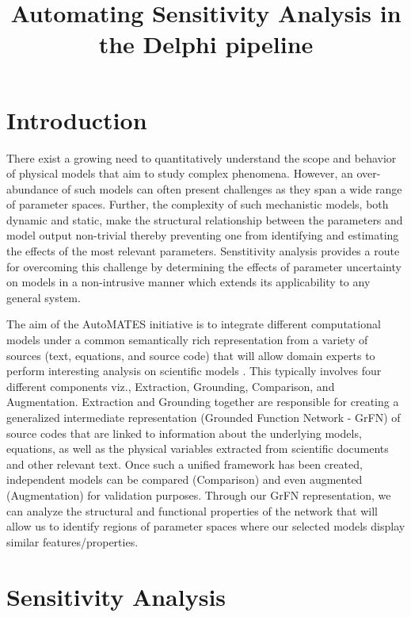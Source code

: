 \documentclass[prb,superscriptaddress,amsmath]{revtex4}
\begin{document}
\title{Automating Sensitivity Analysis in the Delphi pipeline}

\maketitle

\section{Introduction}

There exist a growing need to  quantitatively understand  the scope and behavior of
physical models that aim to study complex phenomena. However, an over-abundance of such
models can often present challenges as they span a wide range of parameter
spaces. Further, the complexity of such mechanistic models, both dynamic
and static, make the structural relationship between the parameters and model output
non-trivial thereby preventing one from identifying and estimating the effects
of the most relevant parameters. Senstitivity analysis provides a route for
overcoming this challenge by determining the effects of parameter uncertainty
on models in a non-intrusive manner which extends its applicability to any
general system.

The aim of the AutoMATES initiative is to integrate different
computational models under a common semantically rich representation from  a
variety of sources (text, equations, and source code) that will
allow domain experts to perform interesting analysis on scientific models \cite{Adarsh20a}. This
typically involves four different components viz., Extraction, Grounding,
Comparison, and Augmentation.
Extraction and Grounding together are responsible for creating a generalized intermediate
representation (Grounded Function Network - GrFN) of source codes that are linked to information about the
underlying models, equations, as well as the
physical variables extracted from scientific documents and other relevant text. Once such a unified framework has been
created, independent models can be compared (Comparison) and even augmented (Augmentation) for validation purposes.
Through our GrFN representation,
we can analyze the structural and functional properties of the network that will allow us to
identify regions of parameter spaces where
our selected models display similar features/properties.


\section{Sensitivity Analysis}
\end{document}
